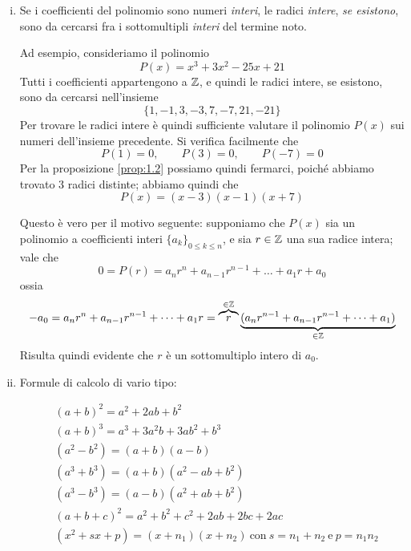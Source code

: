 \begin{enumerate}[(i)]
    \item Se i coefficienti del polinomio sono numeri \emph{interi}, le radici \emph{intere}, \emph{se esistono}, sono da cercarsi fra i sottomultipli \emph{interi} del termine noto.
    \begin{example}
        Ad esempio, consideriamo il polinomio
        \[
        P(x) = x^3+3x^2-25x+21
        \]
        Tutti i coefficienti appartengono a $\amsbb{Z}$, e quindi le radici intere, se esistono, sono da cercarsi nell'insieme
        \[
        \{1, -1, 3, -3, 7, -7, 21, -21\}
        \]
        Per trovare le radici intere è quindi sufficiente valutare il polinomio $P(x)$ sui numeri dell'insieme precedente. Si verifica facilmente che
        \[
        P(1)=0, \qquad P(3)=0, \qquad P(-7)=0 
        \]
        Per la proposizione \ref{prop:1.2} possiamo quindi fermarci, poiché abbiamo trovato 3 radici distinte; abbiamo quindi che
        \[
        P(x) = (x-3)(x-1)(x+7)
        \]
    \end{example}
    Questo è vero per il motivo seguente: supponiamo che $P(x)$ sia un polinomio a coefficienti interi $\{a_k\}_{0\le k \le n}$, e sia $r\in\amsbb{Z}$ una sua radice intera; vale che
    \[
    0=P(r) = a_n r^n + a_{n-1}r^{n-1}+\dots + a_1 r + a_0
    \]
    ossia
    \[
    -a_0 = a_nr^n+a_{n-1}r^{n-1}+\dots + a_1 r = \overbrace{r}^{\in\amsbb{Z}}\underbrace{(a_n r^{n-1}+a_{n-1}r^{n-1}+\dots + a_1)}_{\in \amsbb{Z}}
    \]
    Risulta quindi evidente che $r$ è un sottomultiplo intero di $a_0$.
    \item Formule di calcolo di vario tipo:
    \begin{tcolorbox}
    \vspace{-0.3cm}
        \[
        \begin{split}
            &(a+b)^2 = a^2 + 2ab+b^2 \\
            &(a+b)^3 = a^3+3a^2b+3ab^2+b^3\\
            &(a^2-b^2) = (a+b)(a-b)\\
            &(a^3+b^3) = (a+b)(a^2-ab+b^2)\\
            &(a^3-b^3) = (a-b)(a^2+ab+b^2)\\
            &(a+b+c)^2 = a^2 + b^2 + c^2 +2ab+2bc + 2ac\\
            &(x^2+sx+p) = (x+n_1)(x+n_2) \ \text{con} \ s=n_1 + n_2 \ \text{e} \ p=n_1n_2
        \end{split}
        \]
    \end{tcolorbox}
    \end{enumerate}
